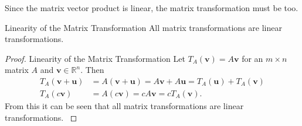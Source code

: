 \noindent Since the matrix vector product is linear, the matrix transformation must be too. 
\begin{theorem}{Linearity of the Matrix Transformation}
    \label{the:linearityMatrixTransformation}
    All matrix transformations are linear transformations.\cite[170]{LiAl}
\end{theorem}
\begin{proof}{Linearity of the Matrix Transformation}
     Let $T_A(\textbf{v})=A\textbf{v}$ for an $m\times n$ matrix $A$ and $\textbf{v} \in \mathbb{R}^n$. Then
     \begin{align*}
         T_A(\textbf{v}+\textbf{u})&=A(\textbf{v}+\textbf{u})=A\textbf{v}+A\textbf{u}=T_A(\textbf{u})+T_A(\textbf{v})\\
         T_A(c\textbf{v})&=A(c\textbf{v})=cA\textbf{v}=cT_A(\textbf{v}).
     \end{align*}
     From this it can be seen that all matrix transformations are linear transformations. \cite[170]{LiAl}
\end{proof}

